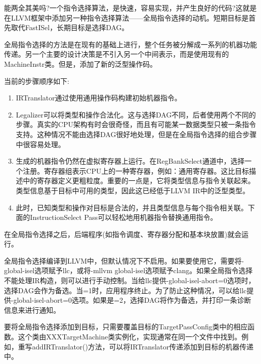 能两全其美吗?一个指令选择算法，是快速，容易实现，并产生良好的代码?这就是在LLVM框架中添加另一种指令选择算法——全局指令选择的动机。短期目标是首先取代FastISel，长期目标是选择DAG。\par

全局指令选择的方法是在现有的基础上进行，整个任务被分解成一系列的机器功能传递。另一个主要的设计决策是不引入另一个中间表示，而是使用现有的MachineInstr类。但是，添加了新的泛型操作码。\par

当前的步骤顺序如下:\par

\begin{enumerate}
\item IRTranslator通过使用通用操作码构建初始机器指令。

\item Legalizer可以将类型和操作合法化。这与选择DAG不同，后者使用两个不同的步骤。真实的CPU架构有时会很奇怪，而且有可能某一数据类型只被一条指令支持。这种情况不能由选择DAG很好地处理，但是在全局指令选择的组合步骤中很容易处理。

\item 生成的机器指令仍然在虚拟寄存器上运行。在RegBankSelect通道中，选择一个注册。寄存器组表示CPU上的一种寄存器，例如：通用寄存器。这比目标描述中的寄存器定义更粗粒度。重要的一点是，它将类型信息与指令关联起来。类型信息基于目标中可用的类型，因此这已经低于LLVM IR中的泛型类型。

\item 此时，已知类型和操作对目标是合法的，并且类型信息与每个指令相关联。下面的InstructionSelect Pass可以轻松地用机器指令替换通用指令。
\end{enumerate}

在全局指令选择之后，后端程序(如指令调度、寄存器分配和基本块放置)就会运行。\par

全局指令选择编译到LLVM中，但默认情况下不启用。如果要使用它，需要将-global-isel选项赋予llc，或将-mllvm global-isel选项赋予clang。如果全局指令选择不能处理IR构造，则可以进行手动控制。当给llc提供-global-isel-abort=0选项时，选择DAG会作为备选。当=1时，应用程序终止。为了防止这种情况，可以给llc提供-global-isel-abort=0选项。如果是=2，选择DAG将作为备选，并打印一条诊断信息来进行通知。\par

要将全局指令选择添加到目标，只需要覆盖目标的TargetPassConfig类中的相应函数。这个类由XXXTargetMachine类实例化，实现通常在同一个文件中找到。例如，重写addIRTranslator()方法，可以将IRTranslator传递添加到目标的机器传递中。\par

